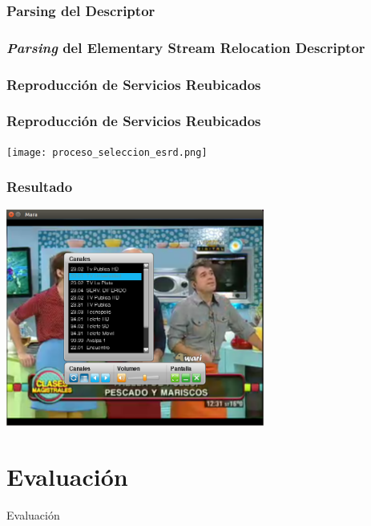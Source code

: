 \documentclass[a4paper,11pt]{beamer}
\begin{document}
		\subsubsection{Parsing del Descriptor}
		\begin{frame}
			\frametitle{\emph{Parsing} del Elementary Stream Relocation Descriptor}
			\resizebox{\textwidth}{!}{
				
			}
		\end{frame}

		\subsubsection{Reproducción de Servicios Reubicados}
		\begin{frame}
			\frametitle{Reproducción de Servicios Reubicados}
			\begin{center}
				\texttt{[image: proceso\_seleccion\_esrd.png]}
			\end{center}
		\end{frame}
		\begin{frame}
			\frametitle{Resultado}
			\begin{center}
				\includegraphics[width=8.5cm]{screenshot_mara.png}
			\end{center}
		\end{frame}

\section{Evaluación}
		
\begin{frame}

\begin{center}
\Huge Evaluación
\end{center}

\end{frame}
\end{document}
